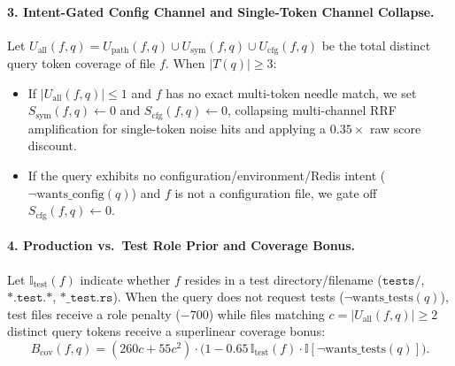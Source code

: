 \documentclass[11pt]{article}
\begin{document}
\paragraph{3. Intent-Gated Config Channel and Single-Token Channel Collapse.}
Let $U_{\text{all}}(f, q) = U_{\text{path}}(f, q) \cup U_{\text{sym}}(f, q) \cup U_{\text{cfg}}(f, q)$ be the total distinct query token coverage of file $f$. When $|T(q)| \ge 3$:
\begin{itemize}
    \item If $|U_{\text{all}}(f, q)| \le 1$ and $f$ has no exact multi-token needle match, we set $S_{\text{sym}}(f, q) \gets 0$ and $S_{\text{cfg}}(f, q) \gets 0$, collapsing multi-channel RRF amplification for single-token noise hits and applying a $0.35\times$ raw score discount.
    \item If the query exhibits no configuration/environment/Redis intent ($\neg \text{wants\_config}(q)$) and $f$ is not a configuration file, we gate off $S_{\text{cfg}}(f, q) \gets 0$.
\end{itemize}

\paragraph{4. Production vs.\ Test Role Prior and Coverage Bonus.}
Let $\mathbb{I}_{\text{test}}(f)$ indicate whether $f$ resides in a test directory/filename ($\texttt{tests/}$, $\texttt{*.test.*}$, $\texttt{*\_test.rs}$). When the query does not request tests ($\neg \text{wants\_tests}(q)$), test files receive a role penalty ($-700$) while files matching $c = |U_{\text{all}}(f, q)| \ge 2$ distinct query tokens receive a superlinear coverage bonus:
\begin{equation}
B_{\text{cov}}(f, q) = (260 c + 55 c^2) \cdot \bigl(1 - 0.65\,\mathbb{I}_{\text{test}}(f)\cdot \mathbb{I}[\neg \text{wants\_tests}(q)]\bigr).
\end{equation}
\end{document}
